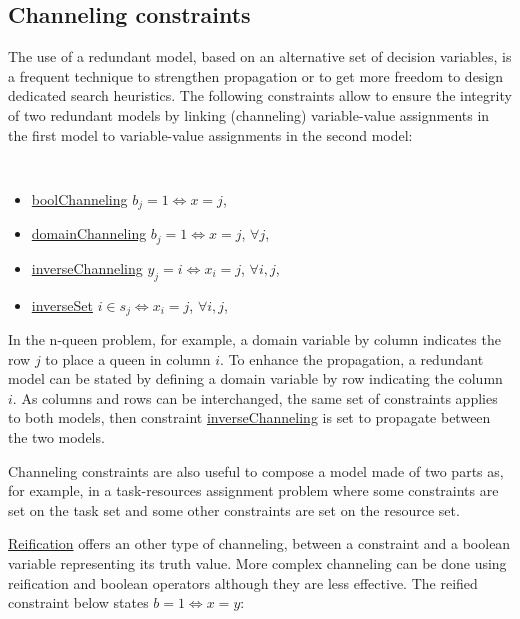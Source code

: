 \subsection{Channeling constraints}\label{model:channelingconstraints}\hypertarget{model:channelingconstraints}{}
The use of a redundant model, based on an alternative set of decision variables, is a frequent technique to strengthen propagation or to get more freedom to design dedicated search heuristics. 
The following constraints allow to ensure the integrity of two redundant models by linking (channeling) variable-value assignments in the first model to variable-value assignments in the second model:
\begin{notedef}\tt
  \begin{itemize}
  \item \hyperlink{boolchanneling:boolchannelingconstraint}{boolChanneling} $b_j=1 \iff x=j$, 
  \item \hyperlink{domainchanneling:domainchannelingconstraint}{domainChanneling} $b_j=1 \iff x=j$, $\forall j$, 
  \item \hyperlink{inversechanneling:inversechannelingconstraint}{inverseChanneling} $y_j=i \iff x_i=j$, $\forall i, j$, 
  \item \hyperlink{inverseset:inversesetconstraint}{inverseSet} $i\in s_j \iff x_i=j$, $\forall i,j$, 
  \end{itemize}
\end{notedef}
In the n-queen problem, for example, a domain variable by column indicates the row $j$ to place a queen in column $i$. To enhance the propagation, a redundant model can be stated by defining a domain variable by row indicating the column $i$. As columns and rows can be interchanged, the same set of constraints applies to both models, then constraint \hyperlink{inversechanneling:inversechannelingconstraint}{inverseChanneling} is set to propagate between the two models.


Channeling constraints are also useful to compose a model made of two parts as, for example, in a task-resources assignment problem where some constraints are set on the task set and some other constraints are set on the resource set.

\hyperlink{model:reifiedconstraints}{Reification} offers an other type of channeling, between a constraint and a boolean variable representing its truth value. 
More complex channeling can be done using reification and boolean operators although they are less effective. 
The reified constraint below states $b=1\iff x=y$:



